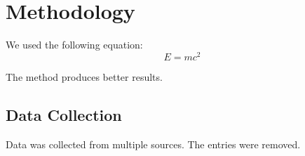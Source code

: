 \section{Methodology}
\label{sec:method}

We used the following equation:
\begin{equation}
    E = mc^2
    \label{eq:energy}
\end{equation}

The  method produces better results.

\subsection{Data Collection}
Data was collected from multiple sources. The  entries were removed.
